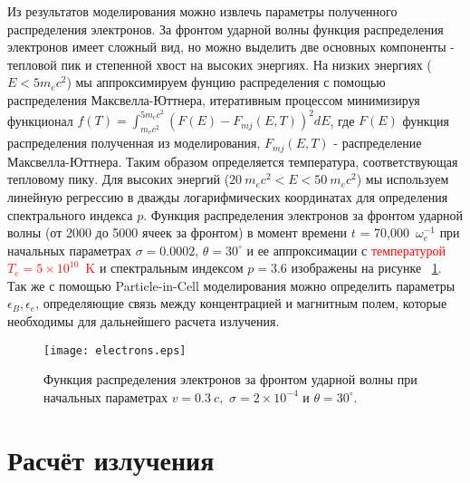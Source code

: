 Из результатов моделирования можно извлечь параметры полученного распределения электронов. За фронтом ударной волны функция распределения электронов имеет сложный вид, но можно выделить две основных компоненты - тепловой пик и степенной хвост на высоких энергиях.
На низких энергиях ($\displaystyle E < 5 m_e c^2$) мы аппроксимируем фунцию распределения с помощью распределения Максвелла-Юттнера, итеративным процессом минимизируя функционал $\displaystyle f(T) = \int_{m_e c^{2}}^{5 m_e c^{2}} (F(E) - F_{mj}(E,T))^{2}dE$, где $\displaystyle F(E)$ функция распределения полученная из моделирования, $\displaystyle F_{mj}(E,T)$ - распределение Максвелла-Юттнера. Таким образом определяется температура, соответствующая тепловому пику. Для высоких энергий ($\displaystyle 20~m_e c^{2} < E < 50~m_e c^{2}$) мы используем линейную регрессию в дважды логарифмических координатах для определения спектрального индекса $p$. Функция распределения электронов за фронтом ударной волны (от 2000 до 5000 ячеек за фронтом) в момент времени $\displaystyle t$ = 70,000~$\omega_{e}^{-1}$ при начальных параметрах $\displaystyle\sigma = 0.0002$, $\theta = 30^\circ$ и ее аппроксимации с \textcolor{red}{температурой $\displaystyle T_e = 5\times 10^{10}$~K} и спектральным индексом $\displaystyle p = 3.6$ изображены на рисунке ~\ref{electrons}.
Так же с помощью Particle-in-Cell моделирования можно определить параметры $\epsilon_B, \epsilon_e$, определяющие связь между концентрацией и магнитным полем, которые необходимы для дальнейшего расчета излучения.
\begin{figure}
		\centering
		\texttt{[image: electrons.eps]} 
		\caption{Функция распределения электронов за фронтом ударной волны при начальных параметрах $v = 0.3~c,$ $\sigma = 2\times10^{-4}$ и $\theta = 30^{\circ}$.}
		\label{electrons}
\end{figure}

\section{Расчёт излучения}

